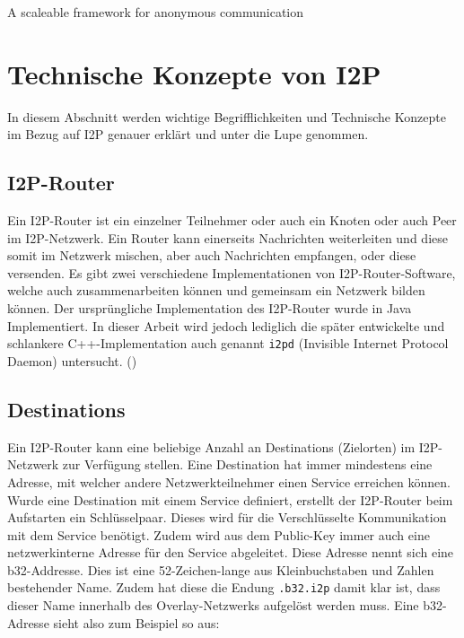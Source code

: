\cite{timpanaro_evaluation_2015}

A scaleable framework for anonymous communication
\cite{noauthor_i2p_nodate-8}


\cite{hoang_measuring_2019}
\cite{hoang_empirical_2018}


\section{Technische Konzepte von I2P}
\label{sec:technischeKonzepte}

In diesem Abschnitt werden wichtige Begrifflichkeiten und Technische Konzepte im Bezug auf I2P genauer erklärt und unter die Lupe genommen.

\subsection{I2P-Router}\label{sec:router}

Ein I2P-Router ist ein einzelner Teilnehmer oder auch ein Knoten oder auch Peer im I2P-Netzwerk.
Ein Router kann einerseits Nachrichten weiterleiten und diese somit im Netzwerk mischen, aber auch Nachrichten empfangen, oder diese versenden.
Es gibt zwei verschiedene Implementationen von I2P-Router-Software, welche auch zusammenarbeiten können und gemeinsam ein Netzwerk bilden können.
Der ursprüngliche Implementation des I2P-Router wurde in Java Implementiert.
In dieser Arbeit wird jedoch lediglich die später entwickelte und schlankere C++-Implementation auch genannt \lstinline|i2pd| (Invisible Internet Protocol Daemon) untersucht. (\cite{noauthor_i})

\subsection{Destinations}

Ein I2P-Router kann eine beliebige Anzahl an Destinations (Zielorten) im I2P-Netzwerk zur Verfügung stellen.
Eine Destination hat immer mindestens eine Adresse, mit welcher andere Netzwerkteilnehmer einen Service erreichen können.
Wurde eine Destination mit einem Service definiert, erstellt der I2P-Router beim Aufstarten ein Schlüsselpaar.
Dieses wird für die Verschlüsselte Kommunikation mit dem Service benötigt.
Zudem wird aus dem Public-Key immer auch eine netzwerkinterne Adresse für den Service abgeleitet.
Diese Adresse nennt sich eine b32-Addresse.
Dies ist eine 52-Zeichen-lange aus Kleinbuchstaben und Zahlen bestehender Name.
Zudem hat diese die Endung \lstinline|.b32.i2p| damit klar ist, dass dieser Name innerhalb des Overlay-Netzwerks aufgelöst werden muss.
Eine b32-Adresse sieht also zum Beispiel so aus:

